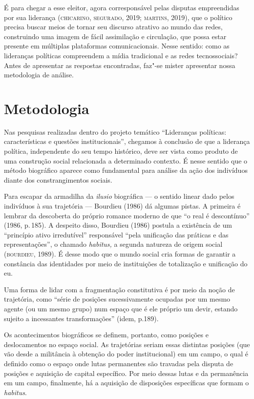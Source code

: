 É para chegar a esse eleitor, agora corresponsável pelas disputas
empreendidas por sua liderança (\textsc{chicarino}, \textsc{segurado}, 2019; \textsc{martins},
2019), que o político precisa buscar meios de tornar seu discurso
atrativo ao mundo das redes, construindo uma imagem de fácil assimilação
e circulação, que possa estar presente em múltiplas plataformas
comunicacionais. Nesse sentido: como as lideranças políticas compreendem
a mídia tradicional e as redes tecnossociais? Antes de apresentar as
respostas encontradas, faz"-se mister apresentar nossa metodologia de
análise.

\section{Metodologia}

Nas pesquisas realizadas dentro do projeto temático ``Lideranças
políticas: características e questões institucionais'', chegamos à
conclusão de que a liderança política, independente do seu tempo
histórico, deve ser vista como produto de uma construção social
relacionada a determinado contexto. É nesse sentido que o método
biográfico aparece como fundamental para análise da ação dos indivíduos
diante dos constrangimentos sociais.

Para escapar da armadilha da \emph{ilusio} biográfica --- o sentido
linear dado pelos indivíduos à sua trajetória --- Bourdieu (1986) dá
algumas pistas. A primeira é lembrar da descoberta do próprio romance
moderno de que ``o real é descontínuo'' (1986, p.\,185). A despeito
disso, Bourdieu (1986) postula a existência de um ``princípio ativo
irredutível'' responsável ``pela unificação das práticas e das
representações'', o chamado \emph{habitus,} a segunda natureza de origem
social (\textsc{bourdieu}, 1989). É desse modo que o mundo social cria formas de
garantir a constância das identidades por meio de instituições de
totalização e unificação do eu.

Uma forma de lidar com a fragmentação constitutiva é por meio da noção
de trajetória, como ``série de posições sucessivamente ocupadas por um
mesmo agente (ou um mesmo grupo) num espaço que é ele próprio um devir,
estando sujeito a incessantes transformações'' (idem, p.189).

Os acontecimentos biográficos se definem, portanto, como posições e
deslocamentos no espaço social. As trajetórias seriam essas distintas
posições (que vão desde a militância à obtenção do poder institucional)
em um campo, o qual é definido como o espaço onde lutas permanentes são
travadas pela disputa de posições e aquisição de capital específico. Por
meio dessas lutas e da permanência em um campo, finalmente, há a
aquisição de disposições específicas que formam o \emph{habitus}.

